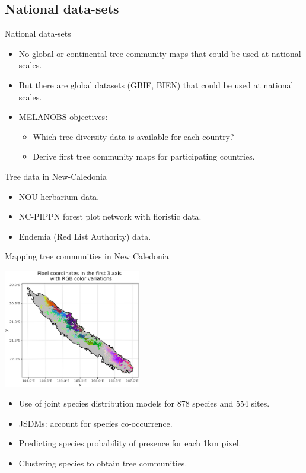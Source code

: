 \documentclass[10pt,table,dvipsnames,compress]{beamer}
\begin{document}
\subsection{National data-sets}
\label{sec:orgb396399}

\begin{frame}[label={sec:org11888a5}]{National data-sets}
\begin{itemize}
\item No global or continental tree community maps that could be used at national scales.
\item But there are global datasets (GBIF, BIEN) that could be used at national scales.
\item MELANOBS objectives:
\begin{itemize}
\item Which tree diversity data is available for each country?
\item Derive first tree community maps for participating countries.
\end{itemize}
\end{itemize}
\end{frame}

\begin{frame}[label={sec:org1e923e1}]{Tree data in New-Caledonia}
\begin{itemize}
\item NOU herbarium data.
\item NC-PIPPN forest plot network with floristic data.
\item Endemia (Red List Authority) data.
\end{itemize}
\end{frame}

\begin{frame}[label={sec:orgf9561b6}]{Mapping tree communities in New Caledonia}
\begin{center}
\includegraphics[width=6cm]{figs/biodiv/jSDM-NC.png}
\end{center}

\begin{itemize}
\item Use of joint species distribution models for 878 species and 554 sites.
\item JSDMs: account for species co-occurrence.
\item Predicting species probability of presence for each 1km pixel.
\item Clustering species to obtain tree communities.
\end{itemize}
\end{frame}
\end{document}
